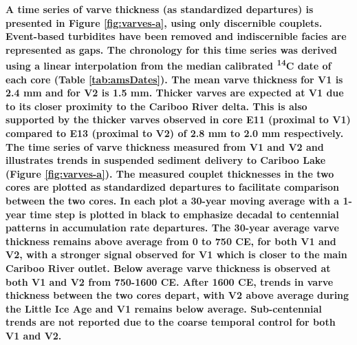 \documentclass[Royal,times,doublespace,sageh]{sagej}
\begin{document}
\textbf{A time series of varve thickness (as standardized departures) is
presented in Figure \ref{fig:varves-a}, using only discernible couplets.
Event-based turbidites have been removed and indiscernible facies are
represented as gaps. The chronology for this time series was derived
using a linear interpolation from the median calibrated
\textsuperscript{14}C date of each core (Table \ref{tab:amsDates}). The
mean varve thickness for V1 is 2.4 mm and for V2 is 1.5 mm. Thicker
varves are expected at V1 due to its closer proximity to the Cariboo
River delta. This is also supported by the thicker varves observed in
core E11 (proximal to V1) compared to E13 (proximal to V2) of 2.8 mm to
2.0 mm respectively. The time series of varve thickness measured from V1
and V2 and illustrates trends in suspended sediment delivery to Cariboo
Lake (Figure \ref{fig:varves-a}). The measured couplet thicknesses in
the two cores are plotted as standardized departures to facilitate
comparison between the two cores. In each plot a 30-year moving average
with a 1-year time step is plotted in black to emphasize decadal to
centennial patterns in accumulation rate departures. The 30-year average
varve thickness remains above average from 0 to 750 CE, for both V1 and
V2, with a stronger signal observed for V1 which is closer to the main
Cariboo River outlet. Below average varve thickness is observed at both
V1 and V2 from 750-1600 CE. After 1600 CE, trends in varve thickness
between the two cores depart, with V2 above average during the Little
Ice Age and V1 remains below average. Sub-centennial trends are not
reported due to the coarse temporal control for both V1 and V2.}
\end{document}
